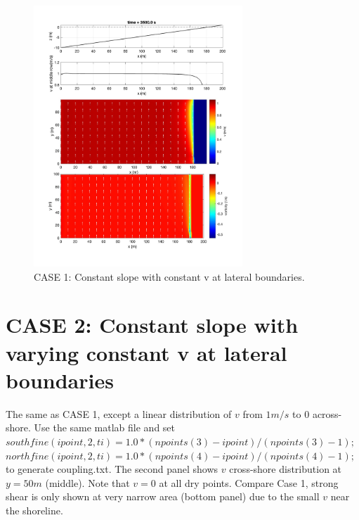\documentclass[preprint,10pt]{elsarticle}
\begin{document}
    
 \begin{figure}
\begin{center}
 \includegraphics[width=0.7\textwidth]{../TEST_couplingbc_wavemaker/postprocessing/case_slope_055.jpg}
 \caption{CASE 1: Constant slope with constant v at lateral boundaries.}
 \label{v1}
 \end{center}
 \end{figure}

\newpage
\section*{CASE 2: Constant slope with varying constant v at lateral boundaries}

The same as CASE 1, except a linear distribution of $v$ from $1 m/s$ to $0$ across-shore. Use the same matlab file and set 
$southfine(ipoint,2,ti)=1.0*(npoints(3)-ipoint)/(npoints(3)-1);$ $northfine(ipoint,2,ti)=1.0*(npoints(4)-ipoint)/(npoints(4)-1);$ 
to generate coupling.txt. The second panel shows $v$ cross-shore distribution at  $y = 50m$ (middle). Note that $v=0$ at all dry points. Compare Case 1, strong shear is only shown at very narrow area (bottom panel) due to the small $v$ near the shoreline. 
\end{document}
